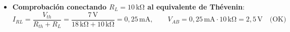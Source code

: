 \begin{ejercicio}
\begin{enumerate}
\begin{itemize}
        \begin{equation*}
            \boxed{R_{th} = R_1 + R_2 = 6\,\si{\kilo\ohm} + 12\,\si{\kilo\ohm} = 18\,\si{\kilo\ohm}} \qquad \left(I_N = \frac{V_{th}}{R_{th}} = \frac{7}{18}\,\si{\milli\ampere}\right)
        \end{equation*}
        \item \textbf{Comprobación conectando $R_L = 10\,\si{\kilo\ohm}$ al equivalente de Thévenin}:
        \begin{equation*}
            I_{RL} = \frac{V_{th}}{R_{th} + R_L} = \frac{7\,\si{\volt}}{18\,\si{\kilo\ohm} + 10\,\si{\kilo\ohm}} = 0{,}25\,\si{\milli\ampere}, \qquad V_{AB} = 0{,}25\,\si{\milli\ampere}\cdot 10\,\si{\kilo\ohm} = 2{,}5\,\si{\volt} \quad \text{(OK)}
        \end{equation*}
    \end{itemize}
\end{enumerate}
\end{ejercicio}

